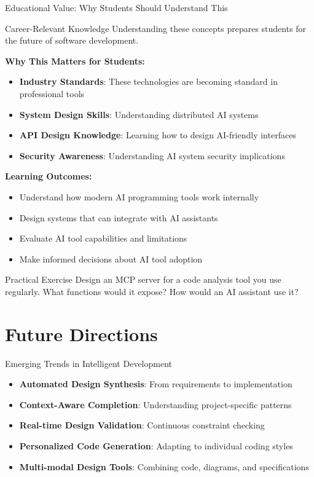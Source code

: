 \documentclass{beamer}
\begin{document}
\begin{frame}[t]{Educational Value: Why Students Should Understand This}
    \begin{block}{Career-Relevant Knowledge}
        Understanding these concepts prepares students for the future of software development.
    \end{block}
    
    \textbf{Why This Matters for Students:}
    \begin{itemize}
        \item \textbf{Industry Standards}: These technologies are becoming standard in professional tools
        \item \textbf{System Design Skills}: Understanding distributed AI systems
        \item \textbf{API Design Knowledge}: Learning how to design AI-friendly interfaces
        \item \textbf{Security Awareness}: Understanding AI system security implications
    \end{itemize}
    
    \textbf{Learning Outcomes:}
    \begin{itemize}
        \item Understand how modern AI programming tools work internally
        \item Design systems that can integrate with AI assistants
        \item Evaluate AI tool capabilities and limitations
        \item Make informed decisions about AI tool adoption
    \end{itemize}
    
    \begin{exampleblock}{Practical Exercise}
        Design an MCP server for a code analysis tool you use regularly. What functions would it expose? How would an AI assistant use it?
    \end{exampleblock}
\end{frame}
\section{Future Directions}
\begin{frame}[t]{Emerging Trends in Intelligent Development}
\begin{itemize}
\item \textbf{Automated Design Synthesis}: From requirements to implementation
\item \textbf{Context-Aware Completion}: Understanding project-specific patterns
\item \textbf{Real-time Design Validation}: Continuous constraint checking
\item \textbf{Personalized Code Generation}: Adapting to individual coding styles
\item \textbf{Multi-modal Design Tools}: Combining code, diagrams, and specifications
\end{itemize}
\end{frame}
\end{document}

